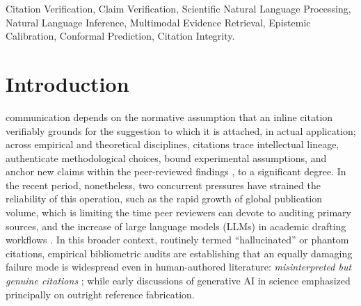 \documentclass[journal]{IEEEtran}
\begin{document}
\begin{IEEEkeywords}
Citation Verification, Claim Verification, Scientific Natural Language Processing, Natural Language Inference, Multimodal Evidence Retrieval, Epistemic Calibration, Conformal Prediction, Citation Integrity.
\end{IEEEkeywords}

\section{Introduction}
 communication depends on the normative assumption that an inline citation verifiably grounds for the suggestion to which it is attached, in actual application; across empirical and theoretical disciplines, citations trace intellectual lineage, authenticate methodological choices, bound experimental assumptions, and anchor new claims within the peer-reviewed findings \cite{moravcsik1975some,jurgens2018measuring}, to a significant degree. In the recent period, nonetheless, two concurrent pressures have strained the reliability of this operation, such as the rapid growth of global publication volume, which is limiting the time peer reviewers can devote to auditing primary sources, and the increase of large language models (LLMs) in academic drafting workflows \cite{hosseini2024using,thorp2023chatgpt}. In this broader context, routinely termed ``hallucinated'' or phantom citations, empirical bibliometric audits are establishing that an equally damaging failure mode is widespread even in human-authored literature: \emph{misinterpreted but genuine citations} \cite{delacey1985accurate,greenberg2009citation,jergas2015quotation,mogull2017accuracy}; while early discussions of generative AI in science emphasized principally on outright reference fabrication.
\end{document}

